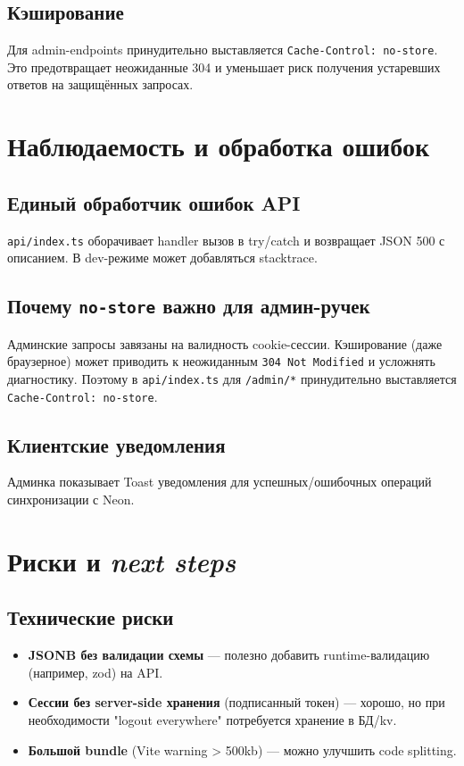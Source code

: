 \documentclass[12pt,a4paper]{article}
\begin{document}
\subsection{Кэширование}
Для admin-endpoints принудительно выставляется \texttt{Cache-Control: no-store}. Это предотвращает неожиданные 304 и уменьшает риск получения устаревших ответов на защищённых запросах.

\section{Наблюдаемость и обработка ошибок}
\subsection{Единый обработчик ошибок API}
\texttt{api/index.ts} оборачивает handler вызов в try/catch и возвращает JSON 500 с описанием. В dev-режиме может добавляться stacktrace.

\subsection{Почему \texttt{no-store} важно для админ-ручек}
Админские запросы завязаны на валидность cookie-сессии. Кэширование (даже браузерное) может приводить к неожиданным \texttt{304 Not Modified} и усложнять диагностику.
Поэтому в \texttt{api/index.ts} для \texttt{/admin/*} принудительно выставляется \texttt{Cache-Control: no-store}.

\subsection{Клиентские уведомления}
Админка показывает Toast уведомления для успешных/ошибочных операций синхронизации с Neon.

\section{Риски и \textit{next steps}}
\subsection{Технические риски}
\begin{itemize}[leftmargin=18pt]
  \item \textbf{JSONB без валидации схемы} --- полезно добавить runtime-валидацию (например, zod) на API.
  \item \textbf{Сессии без server-side хранения} (подписанный токен) --- хорошо, но при необходимости "logout everywhere" потребуется хранение в БД/kv.
  \item \textbf{Большой bundle} (Vite warning > 500kb) --- можно улучшить code splitting.
\end{itemize}
\end{document}
